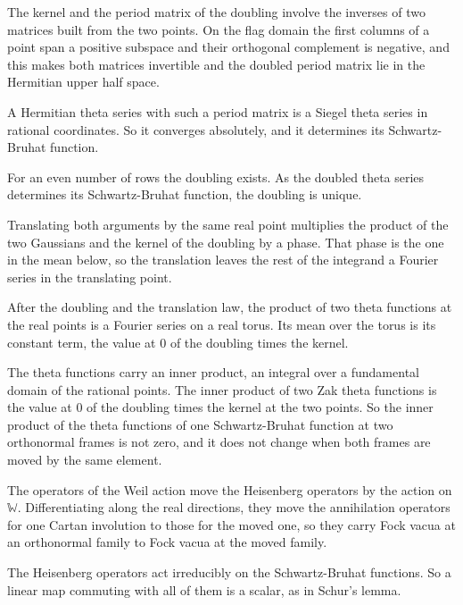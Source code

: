 The kernel and the period matrix of the doubling involve the inverses of two matrices built from the two points. On
the flag domain the first columns of a point span a positive subspace and their orthogonal complement is negative, and
this makes both matrices invertible and the doubled period matrix lie in the Hermitian upper half space.

A Hermitian theta series with such a period matrix is a Siegel theta series in rational coordinates. So it converges
absolutely, and it determines its Schwartz-Bruhat function.

For an even number of rows the doubling exists. As the doubled theta series determines its Schwartz-Bruhat function,
the doubling is unique.

Translating both arguments by the same real point multiplies the product of the two Gaussians and the kernel of the
doubling by a phase. That phase is the one in the mean below, so the translation leaves the rest of the integrand a
Fourier series in the translating point.

After the doubling and the translation law, the product of two theta functions at the real points is a Fourier series
on a real torus. Its mean over the torus is its constant term, the value at $0$ of the doubling times the kernel.

The theta functions carry an inner product, an integral over a fundamental domain of the rational points. The inner
product of two Zak theta functions is the value at $0$ of the doubling times the kernel at the two points. So the inner
product of the theta functions of one Schwartz-Bruhat function at two orthonormal frames is not zero, and it does not
change when both frames are moved by the same element.

The operators of the Weil action move the Heisenberg operators by the action on $\mathbb W$. Differentiating along the
real directions, they move the annihilation operators for one Cartan involution to those for the moved one, so they
carry Fock vacua at an orthonormal family to Fock vacua at the moved family.

The Heisenberg operators act irreducibly on the Schwartz-Bruhat functions. So a linear map commuting with all of them is
a scalar, as in Schur's lemma.


